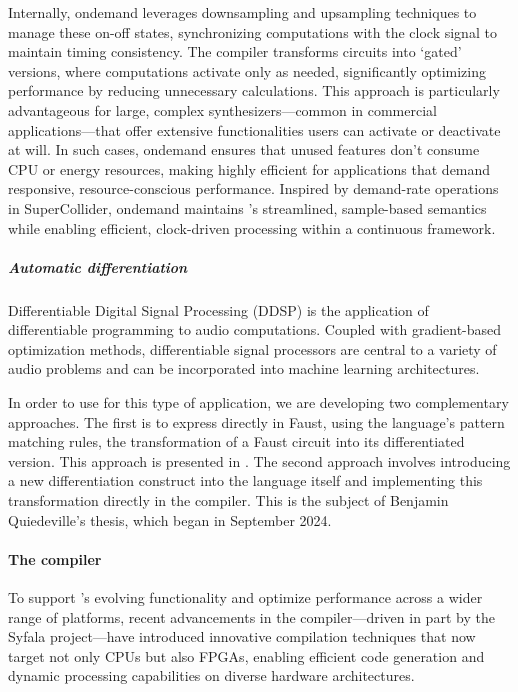 Internally, ondemand leverages downsampling and upsampling techniques to
manage these on-off states, synchronizing computations with the clock
signal to maintain timing consistency. The \F{} compiler transforms
circuits into `gated' versions, where computations activate only as
needed, significantly optimizing performance by reducing unnecessary
calculations. This approach is particularly advantageous for large,
complex synthesizers---common in commercial applications---that offer
extensive functionalities users can activate or deactivate at will. In
such cases, ondemand ensures that unused features don't consume CPU or
energy resources, making \F{} highly efficient for applications that
demand responsive, resource-conscious performance. Inspired by
demand-rate operations in SuperCollider, ondemand maintains \F{}'s
streamlined, sample-based semantics while enabling efficient,
clock-driven processing within a continuous framework.

\subparagraph{Automatic differentiation}

Differentiable Digital Signal Processing (DDSP) \cite{engel2020ddsp} is the application of differentiable programming to audio computations. Coupled with gradient-based optimization methods, differentiable signal processors are central to a variety of audio problems and can be incorporated into machine learning architectures.

In order to use \F{} for this type of application, we are developing two complementary approaches. The first is to express directly in Faust, using the language's pattern matching rules, the transformation of a Faust circuit into its differentiated version. This approach is presented in \cite{rushton:hal-04849619}. The second approach involves introducing a new differentiation construct into the language itself and implementing this transformation directly in the \F{} compiler. This is the subject of Benjamin Quiedeville's thesis, which began in September 2024.


\paragraph{The \F{} compiler}

To support \F{}'s evolving functionality and optimize performance
across a wider range of platforms, recent advancements in the \F{}
compiler---driven in part by the Syfala project---have introduced
innovative compilation techniques that now target not only CPUs but also
FPGAs, enabling efficient code generation and dynamic processing
capabilities on diverse hardware architectures.


